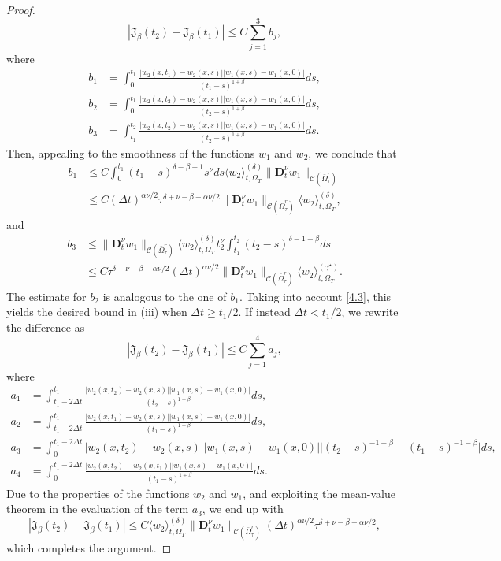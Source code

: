 \documentclass[reqno]{amsart}
\def\C {\mathcal{C}}
\theoremstyle{definition}
\numberwithin{equation}{section}
\begin{document}
\begin{proof}
$$
|\mathfrak{J}_{\beta}(t_2)-\mathfrak{J}_{\beta}(t_1)|\leq C\sum_{j=1}^{3}b_{j},
$$
where
\begin{align*}
b_{1}&=\int_{0}^{t_1}\frac{|w_2(x,t_1)-w_2(x,s)||w_1(x,s)-w_1(x,0)|}{(t_1-s)^{1+\beta}}ds,\\
b_{2}&=\int_{0}^{t_1}\frac{|w_2(x,t_2)-w_2(x,s)||w_1(x,s)-w_1(x,0)|}{(t_2-s)^{1+\beta}}ds,\\
b_{3}&=\int^{t_2}_{t_1}\frac{|w_2(x,t_2)-w_2(x,s)||w_1(x,s)-w_1(x,0)|}{(t_2-s)^{1+\beta}}ds.
\end{align*}
Then, appealing to the smoothness of the functions $w_1$ and $w_2$,
we conclude that
\begin{align*}
b_1&\leq C\int_{0}^{t_1}(t_1-s)^{\delta-\beta-1}s^{\nu}ds\langle w_2\rangle_{t,\Omega_T}^{(\delta)}\|\mathbf{D}^{\nu}_{t}w_1\|_{\C(\bar{\Omega}_{\tau}^{r})}\\
&
\leq C(\Delta t)^{\alpha\nu/2}\tau^{\delta+\nu-\beta-\alpha\nu/2} \|\mathbf{D}^{\nu}_{t}w_1\|_{\C(\bar{\Omega}_{\tau}^{r})}
\langle w_2\rangle_{t,\Omega_T}^{(\delta)},\end{align*}
and
\begin{align*}
b_3&\leq
\|\mathbf{D}^{\nu}_{t}w_1\|_{\C(\bar{\Omega}_{\tau}^{r})}
\langle w_2\rangle_{t,\Omega_T}^{(\delta)} t_{2}^{\nu}\int_{t_1}^{t_2}(t_2-s)^{\delta-1-\beta}ds\\
&
\leq C\tau^{\delta+\nu-\beta-\alpha\nu/2}(\Delta t)^{\alpha\nu/2}
\|\mathbf{D}^{\nu}_{t}w_1\|_{\C(\bar{\Omega}_{\tau}^{r})}
\langle w_2\rangle_{t,\Omega_T}^{(\gamma^{\star})}.
\end{align*}
The estimate for $b_2$ is analogous to the one of $b_1$.
Taking into account \eqref{4.3}, this yields the desired bound in (iii)
when $\Delta t\geq t_1/2$.
If instead $\Delta t<t_1/2$,
we rewrite the difference as
 \begin{equation}\label{4.5}
|\mathfrak{J}_{\beta}(t_2)-\mathfrak{J}_{\beta}(t_1)|\leq C\sum_{j=1}^{4}a_{j},
\end{equation}
where
\begin{align*}
a_{1}&=\int_{t_1-2\Delta t}^{t_1}\frac{|w_2(x,t_2)-w_2(x,s)||w_1(x,s)-w_1(x,0)|}{(t_2-s)^{1+\beta}}ds,\\
a_{2}&=\int_{t_1-2\Delta t}^{t_1}\frac{|w_2(x,t_1)-w_2(x,s)||w_1(x,s)-w_1(x,0)|}{(t_1-s)^{1+\beta}}ds,\\
a_{3}&=\int_{0}^{t_1-2\Delta t}|w_2(x,t_2)-w_2(x,s)||w_1(x,s)-w_1(x,0)|\Big|(t_2-s)^{-1-\beta}-(t_1-s)^{-1-\beta}\Big|ds,\\
a_{4}&=\int^{t_1-2\Delta t}_{0}\frac{|w_2(x,t_2)-w_2(x,t_1)||w_1(x,s)-w_1(x,0)|}{(t_1-s)^{1+\beta}}ds.
\end{align*}
Due to the properties of the functions $w_2$ and $w_1$, and exploiting  the mean-value theorem in the evaluation of  the term $a_3$, we end up with
\[
|\mathfrak{J}_{\beta}(t_2)-\mathfrak{J}_{\beta}(t_1)|\leq C\langle w_2\rangle_{t,\Omega_{T}}^{(\delta)} \|\mathbf{D}_{t}^{\nu}w_1\|_{\C(\bar{\Omega}_{\tau}^{r})}(\Delta t)^{\alpha\nu/2}\tau^{\delta+\nu-\beta-\alpha\nu/2},
\]
which completes the argument.
\end{proof}
\end{document}
